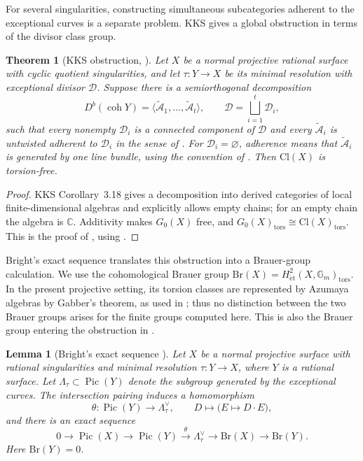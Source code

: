 \documentclass[11pt]{article}
\theoremstyle{plain}
\newtheorem{theorem}{Theorem}[section]
\newtheorem{lemma}[lemma]{Lemma}
\theoremstyle{definition}
\theoremstyle{remark}
\newcommand{\C}{\mathbb C}
\newcommand{\Db}{D^b}
\newcommand{\coh}{\operatorname{coh}}
\newcommand{\Pic}{\operatorname{Pic}}
\newcommand{\Cl}{\mathrm{Cl}}
\newcommand{\Br}{\mathrm{Br}}
\begin{document}
For several singularities, constructing simultaneous subcategories
adherent to the exceptional curves is a separate problem. KKS gives a
global obstruction in terms of the divisor class group.

\begin{theorem}[{KKS obstruction, \cite[Corollary~4.8]{KKS2020}}]
\label{thm:kks-obstruction}
Let \(X\) be a normal projective rational surface with cyclic quotient
singularities, and let \(\tau:Y\to X\) be its minimal resolution with
exceptional divisor \(\mathcal D\). Suppose there is a semiorthogonal decomposition
\[
\Db(\coh Y)=\langle\widetilde{\mathcal A}_1,\ldots,
\widetilde{\mathcal A}_t\rangle,
\qquad \mathcal D=\bigsqcup_{i=1}^t\mathcal D_i,
\]
such that every nonempty \(\mathcal D_i\) is a connected component of \(\mathcal D\)
and every \(\widetilde{\mathcal A}_i\) is untwisted adherent to
\(\mathcal D_i\) in the sense of \cite[Definition~3.6]{KKS2020}.
For \(\mathcal D_i=\varnothing\), adherence means that
\(\widetilde{\mathcal A}_i\) is generated by one line bundle,
using the convention of \cite[Remark~3.8]{KKS2020}.
Then \(\Cl(X)\) is torsion-free.
\end{theorem}

\begin{proof}
KKS Corollary~3.18 gives a decomposition into derived categories of
local finite-dimensional algebras and explicitly allows empty chains;
for an empty chain the algebra is \(\C\). Additivity makes \(G_0(X)\) free,
and \(G_0(X)_{\mathrm{tors}}\cong\Cl(X)_{\mathrm{tors}}\).
This is the proof of \cite[Corollary~4.8]{KKS2020}, using
\cite[Corollary~3.18, Lemma~4.1, and Proposition~4.4]{KKS2020}.
\end{proof}

Bright's exact sequence translates this obstruction into a Brauer-group
calculation. We use the cohomological Brauer group
\(\Br(X)=H^2_{\mathrm{\acute et}}(X,\mathbb G_m)_{\mathrm{tors}}\). In
the present projective setting, its torsion classes are represented by Azumaya
algebras by Gabber's theorem, as used in
\cite[proof of Theorem~6]{Bright2013}; thus no distinction between the two
Brauer groups arises for the finite groups computed here. This is also the
Brauer group entering the obstruction in \cite[Corollary~4.8]{KKS2020}.

\begin{lemma}[Bright's exact sequence {\cite[Proposition~1 and Section~3]{Bright2013}}]\label{rem:brauer-obstruction}
Let \(X\) be a normal projective surface with rational singularities and
minimal resolution \(\tau:Y\to X\), where \(Y\) is a rational surface. Let
\(\Lambda_\tau\subset \Pic(Y)\) denote the subgroup generated by the exceptional
curves. The intersection pairing induces a homomorphism
\[
\theta:\Pic(Y)\longrightarrow \Lambda_\tau^\vee,
\qquad
D\longmapsto \bigl(E\mapsto D\cdot E\bigr),
\]
and there is an exact sequence
\[
0
\longrightarrow
\Pic(X)
\longrightarrow
\Pic(Y)
\xrightarrow{\theta}
\Lambda_\tau^\vee
\longrightarrow
\Br(X)
\longrightarrow
\Br(Y).
\]
Here \(\Br(Y)=0\).
\end{lemma}
\end{document}
